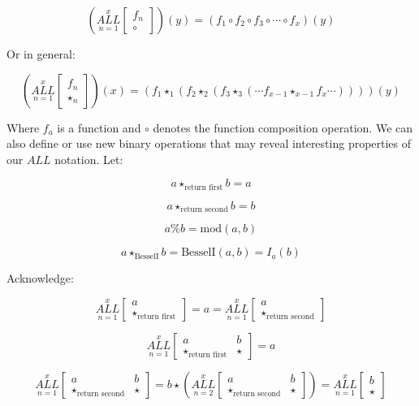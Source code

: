 \documentclass{article}
\begin{document}
$$(\underset{n=1}{\overset{x}{ALL}} \begin{bmatrix}
f_n \\
\circ
\end{bmatrix}) (y) = (f_1 \circ f_2 \circ f_3 \circ \cdots \circ f_x)(y)$$

Or in general:

$$(\underset{n=1}{\overset{x}{ALL}} \begin{bmatrix}
f_n \\
\star_n
\end{bmatrix}) (x) = (f_1 \star_1 (f_2 \star_2 (f_3 \star_3 (\cdots f_{x-1} \star_{x-1} f_x \cdots))))(y)$$

Where $f_a$ is a function and $\circ$ denotes the function composition operation. We can also define or use new binary operations that may reveal interesting properties of our $ALL$ notation. Let:

$$a \star_{\text{return first}} b = a$$

$$a \star_{\text{return second}} b = b$$

$$a \% b = \text{mod}(a,b)$$

$$a \star_{\text{BesselI}} b = \text{BesselI}(a,b) = I_a(b)$$

Acknowledge:

$$\underset{n=1}{\overset{x}{ALL}} \begin{bmatrix}
a \\
\star_{\text{return first}}
\end{bmatrix} = a = \underset{n=1}{\overset{x}{ALL}} \begin{bmatrix}
a \\
\star_{\text{return second}}
\end{bmatrix}$$

$$\underset{n=1}{\overset{x}{ALL}} \begin{bmatrix}
a & b\\
\star_{\text{return first}} & \star
\end{bmatrix} = a$$

$$\underset{n=1}{\overset{x}{ALL}} \begin{bmatrix}
a & b\\
\star_{\text{return second}} & \star
\end{bmatrix} = b \star (\underset{n=2}{\overset{x}{ALL}} \begin{bmatrix}
a & b\\
\star_{\text{return second}} & \star
\end{bmatrix}) = \underset{n=1}{\overset{x}{ALL}} \begin{bmatrix}
b\\
\star
\end{bmatrix}$$
\end{document}
